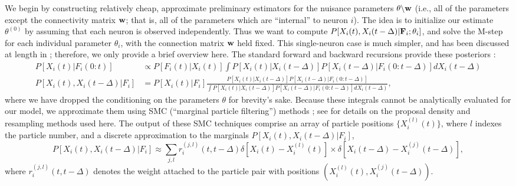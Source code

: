 We begin by constructing relatively cheap, approximate preliminary
estimators for the nuisance parameters $\theta \backslash \mathbf{w}$ (i.e.,
all of the parameters except the connectivity matrix $\mathbf{w}$; that is,
all of the parameters which are ``internal'' to neuron $i$).  The idea
is to initialize our estimate $\theta^{(0)}$ by assuming that each
neuron is observed independently.  Thus we want to compute $P[X_i(t),
X_i(t-\Delta) | {\bf F}_i; \mathbf{\theta}_i]$, and solve the M-step for each
individual parameter $\theta_i$, with the connection matrix $\mathbf{w}$ held
fixed.  This single-neuron case is much simpler, and has been
discussed at length in \cite{Vogelstein2009}; therefore, we only
provide a brief overview here.  The standard forward and backward
recursions provide these posteriors \cite{ShumwayStoffer06}:
\begin{align}
  P[X_i(t) | F_i(0:t)] &\propto P[F_i(t)| X_i(t)] \int P[X_i(t)
| X_i(t-\Delta)] P[X_i(t-\Delta) | F_i(0:t-\Delta)] dX_i(t-\Delta)
\label{eqn:forward} \\ P[X_i(t), X_i(t-\Delta) | F_i] &= P[X_i(t) | F_i]
\frac{P[X_i(t) | X_i(t-\Delta)] P[X_i(t-\Delta) |
F_i(0:t-\Delta)]}{\int P[X_i(t) | X_i(t-\Delta)] P[X_i(t-\Delta) |
F_i(0:t-\Delta)] dX_i(t-\Delta)},
\label{eqn:backward}
\end{align}
where we have dropped the conditioning on the parameters $\theta$ for
brevity's sake.  Because these integrals cannot be analytically
evaluated for our model, we approximate them using SMC (``marginal
particle filtering'') methods \cite{DGA00,DFG01,GDW04}; see
\cite{Vogelstein2009} for details on the proposal density and
resampling methods used here.  The output of these SMC techniques
comprise an array of particle positions $\{X_i^{(l)}(t)\}$, where $l$
indexes the particle number, and a discrete approximation to the
marginals $P[X_i(t), X_i(t-\Delta) | F_i]$, 
\begin{equation}
  P[X_i(t), X_i(t-\Delta) | F_i] \approx \sum_{j,l}
  r_i^{(j,l)}(t,t-\Delta) \delta \left[ X_i(t) - X_i^{(l)}(t) \right]
  \times \delta \left[ X_i(t-\Delta) - X_i^{(j)}(t-\Delta) \right],
  \label{eq:particle-fb}
\end{equation}
where $r_i^{(j,l)}(t,t-\Delta)$ denotes the weight attached to the
particle pair with positions $\left( X_i^{(l)}(t), X_i^{(j)}(t-\Delta)
\right)$.

